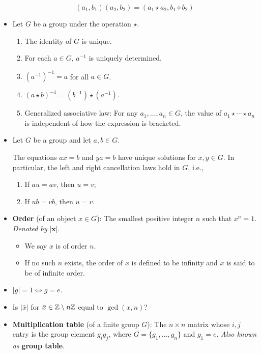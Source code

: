 \documentclass[../main.tex]{subfiles}
\begin{document}
\begin{itemize}
\begin{equation*}
        (a_1,b_1)(a_2,b_2) = (a_1\star a_2,b_1\diamond b_2)
    \end{equation*}
    \item Let $G$ be a group under the operation $\star$.
    \begin{proposition}\leavevmode
        \begin{enumerate}[label={\textbf{\textup{(\arabic*)}}}]
            \item The identity of $G$ is unique.
            \item For each $a\in G$, $a^{-1}$ is uniquely determined.
            \item $(a^{-1})^{-1}=a$ for all $a\in G$.
            \item $(a\star b)^{-1}=(b^{-1})\star(a^{-1})$.
            \item Generalized associative law: For any $a_1,\dots,a_n\in G$, the value of $a_1\star\cdots\star a_n$ is independent of how the expression is bracketed.
        \end{enumerate}
    \end{proposition}
    \item Let $G$ be a group and let $a,b\in G$.
    \begin{proposition}
        The equations $ax=b$ and $ya=b$ have unique solutions for $x,y\in G$. In particular, the left and right cancellation laws hold in $G$, i.e.,
        \begin{enumerate}[label={\textbf{\textup{(\arabic*)}}}]
            \item If $au=av$, then $u=v$;
            \item If $ub=vb$, then $u=v$.
        \end{enumerate}
    \end{proposition}
    \item \textbf{Order} (of an object $x\in G$): The smallest positive integer $n$ such that $x^n=1$. \emph{Denoted by} $\bm{|x|}$.
    \begin{itemize}
        \item We say $x$ is of order $n$.
        \item If no such $n$ exists, the order of $x$ is defined to be infinity and $x$ is said to be of infinite order.
    \end{itemize}
    \item $|g|=1\Longleftrightarrow g=e$.
    \item Is $|\bar{x}|$ for $\bar{x}\in\mathbb{Z}\setminus n\mathbb{Z}$ equal to $\gcd(x,n)$?
    \item \textbf{Multiplication table} (of a finite group $G$): The $n\times n$ matrix whose $i,j$ entry is the group element $g_ig_j$, where $G=\{g_1,\dots,g_n\}$ and $g_1=e$. \emph{Also known as} \textbf{group table}.
\end{itemize}
\end{document}
